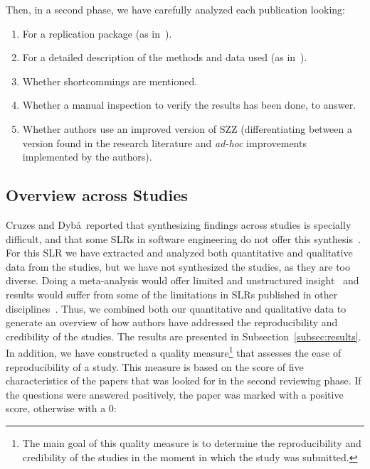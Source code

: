 \documentclass[a4paper, 12pt]{book}
\begin{document}
Then, in a second phase, we have carefully analyzed each publication looking:
\begin{enumerate} 
  \item For a replication package (as in~\cite{robles2010replicating}).
  \item For a detailed description of the methods and data used (as in~\cite{robles2010replicating}).
  \item Whether shortcommings are mentioned.
  \item Whether a manual inspection to verify the results has been done, to answer.
  \item Whether authors use an improved version of SZZ (differentiating between a version found in the research literature and \emph{ad-hoc} improvements implemented by the authors).
\end{enumerate}

\subsection{Overview across Studies}
\label{subsec:overview}

Cruzes and Dyb\aa\ reported that synthesizing findings across studies is specially difficult, and that some SLRs in software engineering do not offer this synthesis~\cite{cruzes2011research}. For this SLR we have extracted and analyzed both quantitative and qualitative data from the studies, but we have not synthesized the studies, as they are too diverse. Doing a meta-analysis would offer limited and unstructured insight~\cite{clarke2000cochrane} and results would suffer from some of the limitations in SLRs published in other disciplines~\cite{rosenthal2001meta}. Thus, we combined both our quantitative and qualitative data to generate an overview of how authors have addressed the reproducibility and credibility of the studies. The results are presented in Subsection~\ref{subsec:results}. 
In addition, we have constructed a quality measure\footnote{The main goal of this quality measure is to determine the reproducibility and credibility of the studies in the moment in which the study was submitted.} that assesses the ease of reproducibility of a study. This measure is based on the score of five characteristics of the papers that was looked for in the second reviewing phase. If the questions were answered positively, the paper was marked with a positive score, otherwise with a 0:
\end{document}
